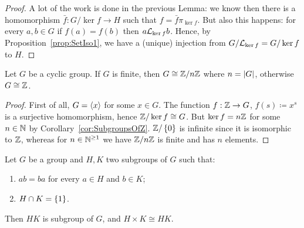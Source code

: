 \begin{proof}
A lot of the work is done in the previous Lemma: we know then there is a homomorphism \(\bar f : G /\ker f \to H\) such that \(f = \bar f \pi_{\ker f}\). But also this happens: for every \(a, b \in G\) if \(f(a) = f(b)\) then \(a \mathcal L_{\ker f} b\). Hence, by Proposition~\ref{prop:SetIso1}, we have a (unique) injection from \(G/\mathcal L_{\ker f} = G/\ker f\) to \(H\).
\end{proof}

\begin{proposition}\label{prop:CyclicClassification}
Let \(G\) be a cyclic group. If \(G\) is finite, then \(G \cong \mathbb Z/n\mathbb Z\) where \(n = \left\lvert G\right\rvert\), otherwise \(G \cong \mathbb Z\).
\end{proposition}

\begin{proof}
First of all, \(G = \left\langle x\right\rangle\) for some \(x \in G\). The function \(f : \mathbb Z \to G\), \(f(s) \coloneq x^s\) is a surjective homomorphism, hence \(\mathbb Z/\ker f \cong G\). But \(\ker f = n\mathbb Z\) for some \(n \in \mathbb N\) by Corollary~\ref{cor:SubgroupsOfZ}. \(\mathbb Z/\left\{0\right\}\) is infinite since it is isomorphic to \(\mathbb Z\), whereas for \(n \in \mathbb N^{\ge 1}\) we have \(\mathbb Z/n\mathbb Z\) is finite and has \(n\) elements.
\end{proof}

\begin{lemma}\label{lem:CartesianIso}
Let \(G\) be a group and \(H, K\) two subgroups of \(G\) such that:
\begin{enumerate}
\item \(ab = ba\) for every \(a \in H\) and \(b \in K\);
\item \(H \cap K = \left\{1\right\}\).
\end{enumerate}
Then \(HK\) is subgroup of \(G\), and \(H \times K \cong HK\).
\end{lemma}

